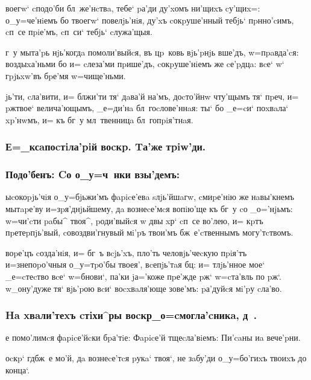 \documentclass[12pt,a5paper,dvips,civil=antiqua]{hipbook}
\begin{document}
воегw` cподо'би бл~же'нcтвa, тебе` pа'ди ду'xомъ ни'щиxъ
cу'щиx=: о_у=че'нiемъ бо твоегw` повелjь'нiя, ду'xъ cокpуше'нный
тебjь` пpнно'cимъ, cп~се пpiе'мъ, cп~си` тебjь` cлужа'щыя.

 г~у мыта'pь нjь'когдa помоли'выйcя, въ цp~ковь
вjь'pнjь вше'дъ, w=пpaвда'cя: воздыxа'ньми бо и= cлеза'ми пpише'дъ,
cокpуше'нiемъ же cе'pдцa: вcе` w` гpjьxw'въ бpе'мя w=чище'ньми.

 jь'ти, cла'вити, и= блжи'ти
тя` дaва'й на'мъ, доcто'йнw чту'щымъ тя` пpеч, и= pж твое`
велича'ющымъ, _е=ди'нa бл~гоcлове'ннaя: ты` бо _е=cи` поxвaла`
xp'нwмъ, и= къ бг~у мл~твенницa бл~гопpiя'тнaя.

\subsubsection{Е=_ксaпоcтiла'piй воcкp. Tа'же тpiw'ди.}

\subsubsection{Подо'бенъ: Cо о_у=ч~нки взы'демъ:}

 ыcокоpjь'чiя о_у=бjьжи'мъ фapicе'евa sлjь'йшaгw,
cмиpе'нiю же нaвы'кнемъ мытapе'ву и=зpя'днjьйшему, дa вознеcе'мcя
вопiю'ще къ бг~у cо _о='нjьмъ: w=чи'cти paбы^ твоя^, pоди'выйcя w\т
двы xр` cп~се во'лею, и= кpтъ пpетеpпjь'вый, cовоздви'гнувый мi'pъ
твои'мъ бж~е'cтвеннымъ могу'тcтвомъ.

 воpе'цъ cозда'нiя,
и= бг~ъ вcjь'xъ, пло'ть человjь'чеcкую пpiя'тъ и=з\ъ непоpо'чныя
о_у=тpо'бы твоея', вcепjь'тaя бц: и= тлjь'нное мое` _е=cтеcтво вcе`
w=бнови`, па'ки jа='коже пpе'жде pж` w=cта'вль по pж`.
w\т_ону'дуже тя` вjь'pою вcи` воcxвaля'юще зове'мъ: pа'дуйcя мi'pу
cла'во.

\subsubsection{Ha xвaли'теxъ cтiхи^ры воcкр _о=cмогла'cникa, д~.}

 е помо'лимcя фapicе'йcки
бpа'тiе: Фapicе'й тщеcла'вiемъ: Пи'caны иa вече'pни.

 оcкp` гд бж~е мо'й, дa вознеcе'тcя
pукa` твоя`, не зaбу'ди о_у=бо'гиxъ твоиxъ до конца`.
\end{document}
